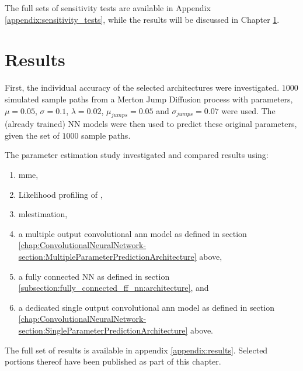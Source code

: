 \documentclass[11pt,oneside,openany,a4paper,english, report, goldenblock
]{usthesis}
\begin{document}
The full sets of sensitivity tests are available in Appendix \ref{appendix:sensitivity_tests}, while the results will be discussed in Chapter \ref{chapter:results}.

\chapter{Results}
\label{chapter:results}

First, the individual accuracy of the selected architectures were investigated. $1000$ simulated sample paths from a Merton Jump Diffusion process with parameters, $\mu = 0.05$, $\sigma = 0.1$, $\lambda = 0.02$, $\mu_{jumps} = 0.05$ and $\sigma_{jumps} = 0.07$ were used. The (already trained) NN models were then used to predict these original parameters, given the set of $1000$ sample paths. 

The parameter estimation study investigated and compared results using: 
\begin{enumerate}[-]
	\itemsep0em 
	\item  \acrshort{mme},
	\item  Likelihood profiling of \citet{Honore},
	\item  \acrshort{mlestimation},
	\item a multiple output convolutional \acrshort{ann} model as defined in section \ref{chap:ConvolutionalNeuralNetwork-section:MultipleParameterPredictionArchitecture} above,
	\item a fully connected NN as defined in section \ref{subsection:fully_connected_ff_nn:architecture}, and
	\item a dedicated single output convolutional \acrshort{ann} model as defined in section \ref{chap:ConvolutionalNeuralNetwork-section:SingleParameterPredictionArchitecture} above.
\end{enumerate}
The full set of results is available in appendix \ref{appendix:results}. Selected portions thereof have been published as part of this chapter.
\end{document}

